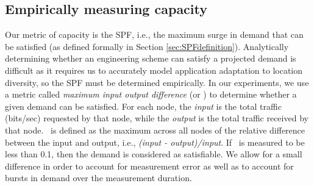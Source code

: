 
\subsection{Empirically measuring capacity}
Our metric of capacity is the SPF, i.e., the maximum surge in demand that can be satisfied (as  defined formally in Section \ref{sec:SPFdefinition}). Analytically determining whether an engineering scheme can satisfy a projected demand is difficult as it requires us to accurately model application adaptation  to location diversity, so the SPF must be determined empirically. In our experiments, we use a metric called {\em maximum input output difference} (or \maxiodiff) to determine whether a given demand can be satisfied. For each node, the {\em input} is the total traffic (bits/sec) requested by that node, while the {\em output} is the total traffic received by that node. \maxiodiff\ is defined as the maximum across all nodes of the relative difference between the input and output, i.e., {\em (input - output)/input}. If \maxiodiff\ is measured to be less than 0.1, then the demand is considered as satisfiable. We allow for a small difference in order to account for measurement error as well as to account for bursts in demand over the measurement duration.

%
%



